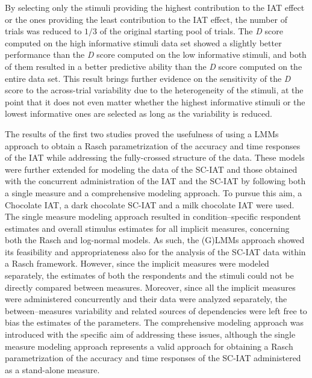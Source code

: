 \documentclass[12pt]{book}
\begin{document}
By selecting only the stimuli providing the highest contribution to the IAT effect or the ones providing the least contribution to the IAT effect, the number of trials was reduced to $1/3$ of the original starting pool of trials. 
The \emph{D} score computed on the high informative stimuli data set showed a slightly better performance than the \emph{D} score computed on the low informative stimuli, and both of them resulted in a better predictive ability than the \emph{D} score computed on the entire data set. 
This result brings further evidence on the sensitivity of the \emph{D} score to the across-trial variability due to the heterogeneity of the stimuli, at the point that it does not even matter whether the highest informative stimuli or the lowest informative ones are selected as long as the variability is reduced. 

The results of the first two studies proved the usefulness of using a LMMs approach to obtain a Rasch parametrization of the accuracy and time responses of the IAT while addressing the fully-crossed structure of the data. These models were further extended for modeling the data of the SC-IAT and those obtained with the concurrent administration of the IAT and the SC-IAT by following both a single measure and a comprehensive modeling approach. 
To pursue this aim, a Chocolate IAT, a dark chocolate SC-IAT and a milk chocolate IAT were used. 
The single measure modeling approach resulted in condition--specific respondent estimates and overall stimulus estimates for all implicit measures, concerning both the Rasch and log-normal models. As such, the (G)LMMs approach showed its feasibility and appropriateness also for the analysis of the SC-IAT data within a Rasch framework. 
However, since the implicit measures were modeled separately, the estimates of both the respondents and the stimuli could not be directly compared between measures. Moreover, since all the implicit measures were administered concurrently and their data were analyzed separately, the between--measures variability and related sources of dependencies were left free to bias the  estimates of the parameters. 
The comprehensive modeling approach was introduced with the specific aim of addressing these issues, although the single measure modeling approach represents a valid approach for obtaining a Rasch parametrization of the accuracy and time responses of the SC-IAT administered as a stand-alone measure.
\end{document}
